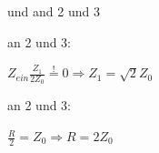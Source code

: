 \begin{pitemize}
    \item \cp und \cm and 2 und 3
    \item \cp an 2 und 3:
    \begin{pitemize}
        \item {}
        \item $Z_{ein} \frac{Z_1}{2Z_0} \overset{!}{=} 0 \Rightarrow Z_1 = \sqrt{2}Z_0$
    \end{pitemize}
    \item \cm an 2 und 3:
    \begin{pitemize}
        \item {}
        \item $\frac{R}{2}=Z_0 \Rightarrow R = 2Z_0$
    \end{pitemize}
\end{pitemize}